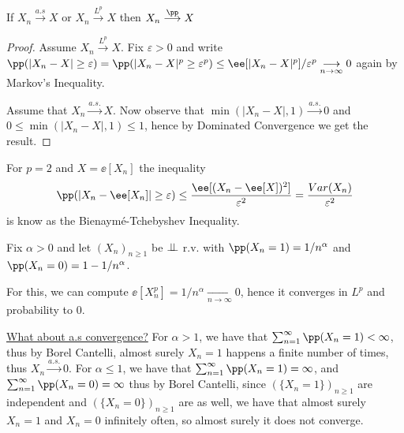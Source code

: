 \documentclass[../main.tex]{subfiles}
\begin{document}
   \begin{proposition}
       If $X_n \overset{a.s}{\longrightarrow} X$ or $X_n
       \overset{L^p}{\longrightarrow} X$ then $X_n
       \overset{\pp}{\longrightarrow} X$
   \end{proposition}
   \begin{proof}
       Assume $X_n \overset{L^p}{\longrightarrow} X$. Fix $\varepsilon>0$ and
       write $\pp(|X_n - X| \geq \varepsilon) = \pp(|X_n - X|^p \geq
       \varepsilon^p) \leq \ee[|X_n - X|^p] / \varepsilon^p \underset{n \to
       \infty}{\longrightarrow}0$ again by Markov's Inequality.

       \vspace{1em}
       \noindent
       Assume that $X_n \overset{a.s.}{\longrightarrow} X$. Now observe that
       $\min(|X_n - X|, 1) \overset{a.s.}{\longrightarrow} 0$ and $0 \leq
       \min(|X_n - X|, 1) \leq 1$, hence by Dominated Convergence we get the
       result.
   \end{proof}
   \begin{remark}
     For $p = 2$ and $X = \ee[X_n]$
     the inequality
       \[
         \pp(|X_n - \ee[X_n]| \geq \varepsilon) \leq \frac{\ee[(X_n -
        \ee[X])^2]}{\varepsilon^2} = \frac{Var(X_n)}{\varepsilon^2}
       \]
       is know as the Bienaymé-Tchebyshev Inequality.
   \end{remark}
   \begin{example}
     Fix $\alpha > 0$ and let $(X_n)_{n \geq 1}$ be $\perp\!\!\!\!\,\perp$ r.v. with
     $\pp(X_n=1) = 1/n^\alpha$ and $\pp(X_n = 0) = 1 - 1/n^\alpha$.

     \vspace{1em}

     \noindent
     For this, we can compute $\ee[X_n^p] = 1/n^\alpha \underset{n \to
     \infty}{\longrightarrow} 0$, hence it converges in $L^p$ and probability
     to $0$.
     
     \vspace{0.5em}
     \noindent\underline{What about a.s convergence?}
     \newline
     For $\alpha > 1$, we have that $\sum_{n=1}^\infty \pp(X_n = 1) < \infty$,
     thus by Borel Cantelli, almost surely $X_n = 1$ happens a finite number
     of times, thus $X_n \overset{a.s.}{\longrightarrow}0$.
     \newline
     For $\alpha \leq 1$, we have that $\sum_{n=1}^\infty \pp(X_n = 1) =
     \infty$, and $\sum_{n = 1}^\infty \pp(X_n = 0) = \infty$
     thus by Borel Cantelli, since $(\{ X_n = 1 \})_{n \geq 1}$ are
     independent and $(\{ X_n = 0 \})_{n \geq 1}$ are as well, we have 
     that almost surely $X_n = 1$ and $X_n = 0$ infinitely often, so almost
     surely it does not converge.
   \end{example}
\end{document}
